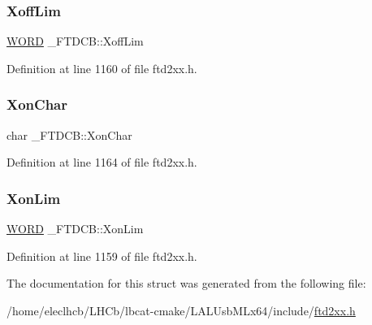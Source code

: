 \subsubsection{\texorpdfstring{Xoff\+Lim}{XoffLim}}
{\footnotesize\ttfamily \hyperlink{CatCaloProto40MHz_2inc_2WinTypes_8h_a197942eefa7db30960ae396d68339b97}{W\+O\+RD} \+\_\+\+F\+T\+D\+C\+B\+::\+Xoff\+Lim}



Definition at line 1160 of file ftd2xx.\+h.

\mbox{\label{struct__FTDCB_aee3e405df31d5b168110814d5529b014}} 
\subsubsection{\texorpdfstring{Xon\+Char}{XonChar}}
{\footnotesize\ttfamily char \+\_\+\+F\+T\+D\+C\+B\+::\+Xon\+Char}



Definition at line 1164 of file ftd2xx.\+h.

\mbox{\label{struct__FTDCB_a44679a1dcfaa0f97bc4d1500538c4b47}} 
\subsubsection{\texorpdfstring{Xon\+Lim}{XonLim}}
{\footnotesize\ttfamily \hyperlink{CatCaloProto40MHz_2inc_2WinTypes_8h_a197942eefa7db30960ae396d68339b97}{W\+O\+RD} \+\_\+\+F\+T\+D\+C\+B\+::\+Xon\+Lim}



Definition at line 1159 of file ftd2xx.\+h.



The documentation for this struct was generated from the following file\+:\begin{DoxyCompactItemize}
\item 
/home/eleclhcb/\+L\+H\+Cb/lbcat-\/cmake/\+L\+A\+L\+Usb\+M\+Lx64/include/\hyperlink{LALUsbMLx64_2include_2ftd2xx_8h}{ftd2xx.\+h}\end{DoxyCompactItemize}
